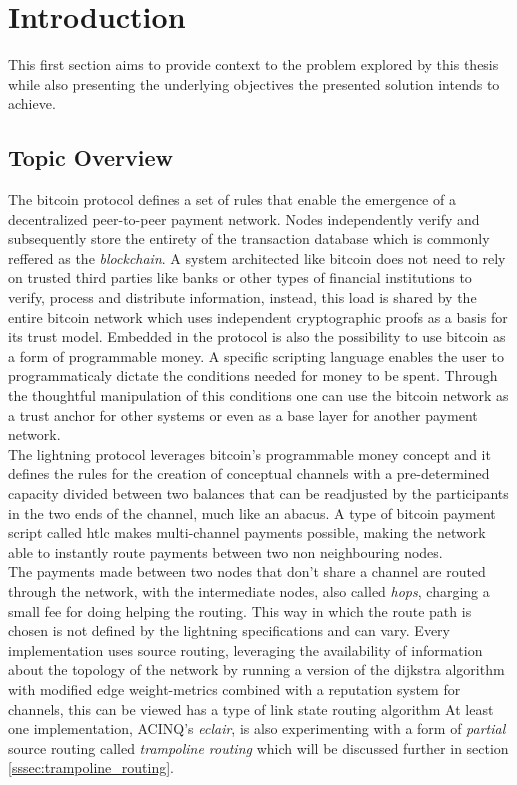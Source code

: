 \section{Introduction}

This first section aims to provide context to the problem explored by this thesis while also presenting the underlying objectives the presented solution intends to achieve.

\subsection{Topic Overview}

The bitcoin protocol \cite{bitcoin} defines a set of rules that enable the emergence of a decentralized peer-to-peer payment network. Nodes independently verify and subsequently store the entirety of the transaction database which is commonly reffered as the \textit{blockchain}. A system architected like bitcoin does not need to rely on trusted third parties like banks or other types of financial institutions to verify, process and distribute information, instead, this load is shared by the entire bitcoin network which uses independent cryptographic proofs as a basis for its trust model.
Embedded in the protocol is also the possibility to use bitcoin as a form of programmable money. A specific scripting language \cite{bitcoin_script} enables the user to programmaticaly dictate the conditions needed for money to be spent. Through the thoughtful manipulation of this conditions one can use the bitcoin network as a trust anchor for other systems or even as a base layer for another payment network. \\
The lightning protocol \cite{lightning_network} leverages bitcoin's programmable money concept and it defines the rules for the creation of conceptual channels with a pre-determined capacity divided between two balances that can be readjusted by the participants in the two ends of the channel, much like an abacus. A type of bitcoin payment script called \acrfull{htlc} makes multi-channel payments possible, making the network able to instantly route payments between two non neighbouring nodes. \\
The payments made between two nodes that don't share a channel are routed through the network, with the intermediate nodes, also called \textit{hops}, charging a small fee for doing helping the routing. This way in which the route path is chosen is not defined by the lightning specifications and can vary. Every implementation uses source routing, leveraging the availability of information about the topology of the network by running a version of the dijkstra algorithm with modified edge weight-metrics combined with a reputation system for channels, this can be viewed has a type of link state routing algorithm At least one implementation, ACINQ's \textit{eclair}, is also experimenting with a form of \textit{partial} source routing called \textit{trampoline routing} which will be discussed further in section \ref{sssec:trampoline_routing}. \\
